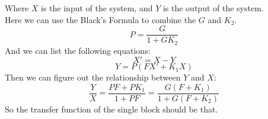 \documentclass[a4paper]{article}
\begin{document}
\noindent Where $X$ is the input of the system, and $Y$ is the output of the system.\\
Here we can use the Black's Formula to combine the $G$ and $K_2$.
$$
P = \frac{G}{1+GK_2}
$$
And we can list the following equations:
$$
X' = X-Y
$$
$$
Y = P(FX'+K_1X)
$$
Then we can figure out the relationship between $Y$ and $X$:
$$
\frac{Y}{X} = \frac{PF+PK_1}{1+PF} = \frac{G(F+K_1)}{1+G(F+K_2)}
$$
So the transfer function of the single block should be that.
\end{document}
